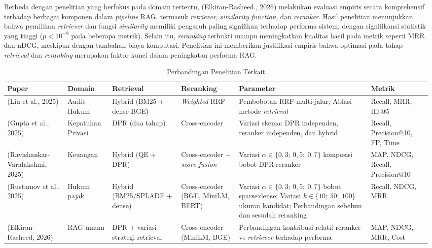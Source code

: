 Berbeda dengan penelitian yang berfokus pada domain tertentu, (Elkiran-Rasheed., 2026) melakukan evaluasi empiris secara komprehensif terhadap berbagai komponen dalam \textit{pipeline} RAG, termasuk \textit{retriever}, \textit{similarity function}, dan \textit{reranker}. Hasil penelitian menunjukkan bahwa pemilihan \textit{retriever} dan fungsi \textit{similarity} memiliki pengaruh paling signifikan terhadap performa sistem, dengan signifikansi statistik yang tinggi ($p < 10^{-9}$ pada beberapa metrik). Selain itu, \textit{reranking} terbukti mampu meningkatkan kualitas hasil pada metrik seperti MRR dan nDCG, meskipun dengan tambahan biaya komputasi. Penelitian ini memberikan justifikasi empiris bahwa optimasi pada tahap \textit{retrieval} dan \textit{reranking} merupakan faktor kunci dalam peningkatan performa RAG.

\begin{table}[!htbp]
\centering
\scriptsize
\caption{Perbandingan Penelitian Terkait}
\label{tab:tinjauan_pustaka}
\setlength{\tabcolsep}{3pt}
\begin{tabular}{|p{1.5cm}|p{1.3cm}|p{2.2cm}|p{1.8cm}|p{4.0cm}|p{1.8cm}|}
\hline
\textbf{Paper} & \textbf{Domain} & \textbf{Retrieval} & \textbf{Reranking} & \textbf{Parameter} & \textbf{Metrik} \\
\hline
(Liu et al., 2025) &
Audit Hukum&
Hybrid (BM25 + dense BGE) &
\textit{Weighted} RRF &
Pembobotan RRF multi-jalur; Ablasi metode \textit{retrieval} &
Recall, MRR, Hit@5 \\
\hline
(Gupta et al., 2025) &
Kepatuhan Privasi&
DPR (dua tahap) &
Cross-encoder &
Variasi skema: DPR independen, reranker independen, dan hybrid &
Recall, Precision@10, FP, Time \\
\hline
(Ravishankar-Varalakshmi, 2025) &
Keuangan &
Hybrid (QE + DPR) &
Cross-encoder + \textit{score fusion} &
Variasi $\alpha \in \{0{,}3;\ 0{,}5;\ 0{,}7\}$ komposisi bobot DPR:reranker &
MAP, NDCG, Recall, Precision@10 \\
\hline
(Rustamov et al., 2025) &
Hukum pajak &
Hybrid (BM25/SPLADE + dense) &
Cross-encoder (BGE, MiniLM, BERT) &
Variasi $\alpha \in \{0{,}3;\ 0{,}5;\ 0{,}7\}$ bobot sparse:dense; Variasi $k \in \{10;\ 50;\ 100\}$ ukuran kandidat; Perbandingan sebelum dan sesudah reranking &
Recall, NDCG, MRR \\
\hline
(Elkiran-Rasheed, 2026) &
RAG umum &
DPR + variasi strategi retrieval &
Cross-encoder (MiniLM, BGE) &
Perbandingan kontribusi relatif reranker vs \textit{retriever} terhadap performa &
MAP, NDCG, MRR, Cost \\
\hline
\end{tabular}
\end{table}

